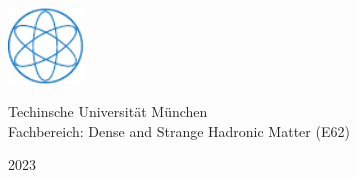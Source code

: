 \documentclass[12pt,twoside]{article}
\begin{document}
{  
  \vspace*{\fill}
  
  
  
  \includegraphics[width=0.15\textwidth]{Figures/PH_CMYK-eps-converted-to.pdf}
  \\[0.3\baselineskip] %
  
  \null
  \vfill
  
  \vspace{1em}
  \large Techinsche Universit\"at M\"unchen\\
   \vspace{0.5em}
  \large Fachbereich: Dense and Strange Hadronic Matter (E62)\\
  \vspace{0.5em}
  
  {\scshape 2023} \\[0.3\baselineskip] %
  
}

\newpage\null\thispagestyle{empty}\newpage



\newpage\null\thispagestyle{empty}\newpage

%

\newpage\null\thispagestyle{empty}\newpage


\restoregeometry
{}
\setcounter{page}{1}
\tableofcontents
\newpage
{}
\pagestyle{headings}





%
%
%
%
%
%
%
%


%
\end{document}
